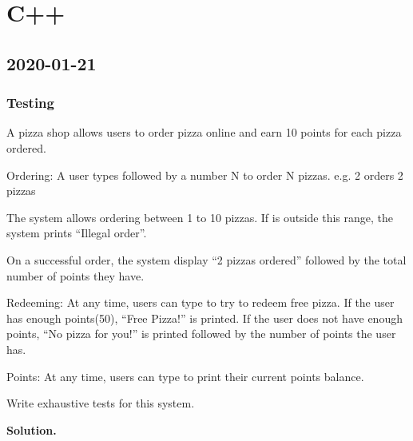 \chapter{C++}
\section{2020-01-21}
\subsection{Testing}
A pizza shop allows users to order pizza online and earn 10 points for each pizza
ordered.

Ordering: A user types  followed by a number N to order N pizzas.
e.g.  2 orders 2 pizzas

The system allows ordering between 1 to 10 pizzas.
If  is outside this range, the system prints ``Illegal order''.

On a successful order, the system display ``2 pizzas ordered''
followed by the total number of points they have.

Redeeming: At any time, users can type  to try to redeem free pizza.
If the user has enough points(50), ``Free Pizza!'' is printed.
If the user does not have enough points, ``No pizza for you!''
is printed followed by the number of points the user has.

Points: At any time, users can type  to print their current points balance.

Write exhaustive tests for this system.

\textbf{Solution.}

